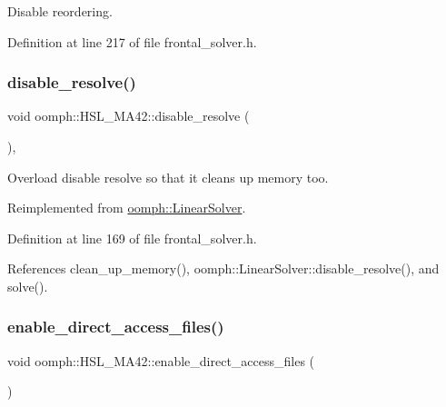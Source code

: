 Disable reordering. 



Definition at line 217 of file frontal\+\_\+solver.\+h.

\mbox{\label{classoomph_1_1HSL__MA42_a8419d983544da158f96ab305549a94a9}} 
\subsubsection{\texorpdfstring{disable\+\_\+resolve()}{disable\_resolve()}}
{\footnotesize\ttfamily void oomph\+::\+H\+S\+L\+\_\+\+M\+A42\+::disable\+\_\+resolve (\begin{DoxyParamCaption}{ }\end{DoxyParamCaption})\hspace{0.3cm}{\ttfamily [inline]}, {\ttfamily [virtual]}}



Overload disable resolve so that it cleans up memory too. 



Reimplemented from \hyperlink{classoomph_1_1LinearSolver_ad61c63af94c5961830bd9807225a48d6}{oomph\+::\+Linear\+Solver}.



Definition at line 169 of file frontal\+\_\+solver.\+h.



References clean\+\_\+up\+\_\+memory(), oomph\+::\+Linear\+Solver\+::disable\+\_\+resolve(), and solve().

\mbox{\label{classoomph_1_1HSL__MA42_a89c5b22abcd421441ae6c6bc51a6a45e}} 
\subsubsection{\texorpdfstring{enable\+\_\+direct\+\_\+access\+\_\+files()}{enable\_direct\_access\_files()}}
{\footnotesize\ttfamily void oomph\+::\+H\+S\+L\+\_\+\+M\+A42\+::enable\+\_\+direct\+\_\+access\+\_\+files (\begin{DoxyParamCaption}{ }\end{DoxyParamCaption})\hspace{0.3cm}{\ttfamily [inline]}}



